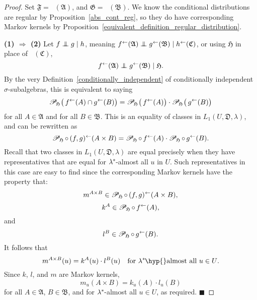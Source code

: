 \documentclass[
twoside=true,
paper=letter,
fontsize=9pt,
pagesize=auto,
leqno,
openany,
headsepline,
overfullrule,
]{scrbook}
\theoremstyle{plain}
\theoremstyle{plain}
\theoremstyle{definition}
\theoremstyle{bfnoteitalic}
\theoremstyle{bfnoteroman}
\newcommand{\sigalg}[1]{\mathfrak{#1}}
\newcommand{\cali}[1]{\mathscr{#1}}
\renewcommand{\qedsymbol}{$\blacksquare$}
\newcommand{\condprobsub}[2]
{\mathop{\cali{P}\hspace{-1.5pt}}\nolimits_{#2}\hspace{-1pt}\left(#1\right)}
\newcommand{\condprobop}[1]{\mathop{\cali{P}\hspace{-1pt}}\nolimits_{#1}}
\newcommand{\textsigma}{\hbox{\large{$\sigma$}}\kern-1pt}
\newcommand{\preimage}[1]{\mathop{#1^{\leftarrow}}}
\newcommand{\meets}{\cap}
\newcommand{\sigmaalgebra}{\sigalg{A}}
\newcommand{\sigmaalgebraii}{\sigalg{B}}
\newcommand{\sigmaalgebraiii}{\sigalg{C}}
\newcommand{\kernast}{\ast\kern-1pt}
\newcommand{\lilstrut}{\vphantom{\bigl(}}
\newcommand{\funcf}{f}
\newcommand{\funcg}{g}
\newcommand{\funch}{h}
\newcommand{\funck}{k}
\newcommand{\funcl}{l}
\newcommand{\funcm}{m}
\newcommand{\function}{f}
\newcommand{\functionii}{g}
\newcommand{\functioniii}{h}
\newcommand{\measureiii}{\lambda}
\newcommand{\measlambda}{\lambda}
\newcommand{\seti}{A}
\newcommand{\setii}{B}
\newcommand{\uspace}{U}%
\newcommand{\uspaceelt}{u}
\newcommand{\uspacesig}{\sigalg{D}}
\newcommand{\condindep}[3]{#1\perp\kern-6pt\perp #2\mid #3}
\begin{document}
\begin{proof}
Set 
$\sigalg{F}=\preimage{\funcf}(\sigmaalgebra)$, 
and $\sigalg{G}=\preimage{\funcg}(\sigmaalgebraii)$.
We know the conditional distributions
are regular by Proposition~\ref{abs_cont_reg}, so they do have corresponding Markov kernels by Proposition~\ref{equivalent_definition_regular_distribution}.


\textbf{(1) $\Rightarrow$ (2)}\quad
Let
$\condindep{\function}{\functionii}{\functioniii}$, meaning
$\condindep{\preimage{\funcf}(\sigmaalgebra)}{\preimage{\funcg}(\sigmaalgebraii)}
{\preimage{\funch}(\sigmaalgebraiii)}$, or using $\sigalg{H}$ in place of
$\preimage{\funch}(\sigmaalgebraiii)$,
\[
\condindep{\preimage{\funcf}(\sigmaalgebra)}{\preimage{\funcg}(\sigmaalgebraii)}
{\sigalg{H}}.
\]
By the very Definition~\ref{conditionally_independent} of conditionally independent \textsigma\hyp{}subalgebras,
this is equivalent to saying
\[
\condprobsub{\lilstrut\preimage{\funcf}(\seti) \meets \preimage{\funcg}(\setii)}{\sigalg{H}}
=
\condprobsub{\lilstrut\preimage{\funcf}(\seti)}{\sigalg{H}}
\cdot
\condprobsub{\lilstrut\preimage{\funcg}(\setii)}{\sigalg{H}}
\]
for all $\seti\in\sigmaalgebra$ and for all $\setii\in\sigmaalgebraii$.
This is an equality of classes in
$L_1(\uspace,\uspacesig,\measureiii)$, and can be rewritten as
\begin{equation}
\condprobop{\sigalg{H}} \circ \preimage{(\funcf,\funcg)}
(\seti\times\setii)
=
\condprobop{\sigalg{H}}\circ \preimage{\funcf}(\seti)
\cdot
\condprobop{\sigalg{H}}\circ \preimage{\funcg}(\setii).
\end{equation}
Recall that two classes in
$L_1(\uspace,\uspacesig,\measureiii)$
are equal precisely when they have representatives that are equal for
$\measlambda^\kernast$\hyp{}almost all $\uspaceelt$ in  $\uspace$.
Such representatives in this case are easy to find since
the corresponding Markov kernels have the property that:
\[
\funcm^{\seti\times\setii} \in
\condprobop{\sigalg{H}} \circ \preimage{(\funcf,\funcg)}
(\seti\times\setii),
\]
\[
\funck^\seti \in
\condprobop{\sigalg{H}}\circ \preimage{\funcf}(\seti),
\]
and
\[
\funcl^\setii \in
\condprobop{\sigalg{H}}\circ \preimage{\funcg}(\setii).
\]
It follows that
\[
\funcm^{\seti\times\setii}(\uspaceelt)
=
\funck^\seti(\uspaceelt)
\cdot
\funcl^\setii(\uspaceelt)
\quad
\text{for $\measlambda^\kernast$\hyp{}almost all $\uspaceelt\in\uspace$.}
\]
Since $\funck$, $\funcl$, and $\funcm$ are Markov kernels,
\[
\funcm_\uspaceelt(\seti\times\setii)
=
\funck_\uspaceelt(\seti)
\cdot
\funcl_\uspaceelt(\setii)
\]
for all $\seti\in\sigmaalgebra$, $\setii\in\sigmaalgebraii$, and for
$\measlambda^\kernast$\hyp{}almost all $\uspaceelt\in\uspace$, as required.
\hfill\qedsymbol


\end{proof}
\end{document}
